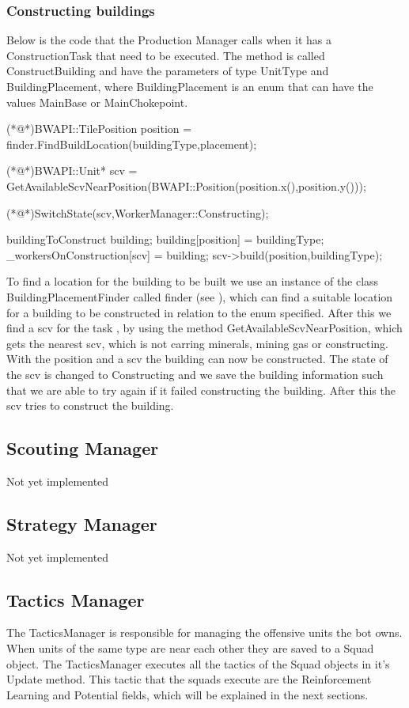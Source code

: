 		\subsubsection*{Constructing buildings}
			Below is the code that the Production Manager calls when it has a ConstructionTask that need to be executed. The method is called 
			ConstructBuilding and have the parameters of type UnitType and BuildingPlacement, where BuildingPlacement 
			is an enum that can have the values MainBase or MainChokepoint.
			\begin{Sourcecode}[caption=ConstructBuilding method]		
	(*@\lnote@*)BWAPI::TilePosition position = finder.FindBuildLocation(buildingType,placement);

	(*@\lnote@*)BWAPI::Unit* scv = GetAvailableScvNearPosition(BWAPI::Position(position.x(),position.y()));
	

	(*@\lnote@*)SwitchState(scv,WorkerManager::Constructing);
	
	buildingToConstruct building;	
	building[position] = buildingType;
	_workersOnConstruction[scv] = building;
	scv->build(position,buildingType);
			\end{Sourcecode}
			
			To find a location for the building to be built we use an instance of the class BuildingPlacementFinder called finder (see ), 
			which can find a suitable location for a building to be constructed in relation to the enum specified. After this we find a scv for the 
			task , by using the method GetAvailableScvNearPosition, which gets the nearest scv, which is not carring minerals, mining gas or 
			constructing. With the position and a scv the building can now be constructed. The state of the scv is changed to Constructing  and 
			we save the building information such that we are able to try again if it failed constructing the building. After this the scv tries to 
			construct the building.
	\subsection{Scouting Manager}
		Not yet implemented
	\subsection{Strategy Manager}
		Not yet implemented
	\subsection{Tactics Manager}
		The TacticsManager is responsible for managing the offensive units the bot owns. When units of the same type are near each other they are saved 
		to a Squad object. The TacticsManager executes all the tactics of the Squad objects in it's Update method. This tactic that the squads execute 
		are the Reinforcement Learning and Potential fields, which will be explained in the next sections.
		
			
		
			
			
				
			
		